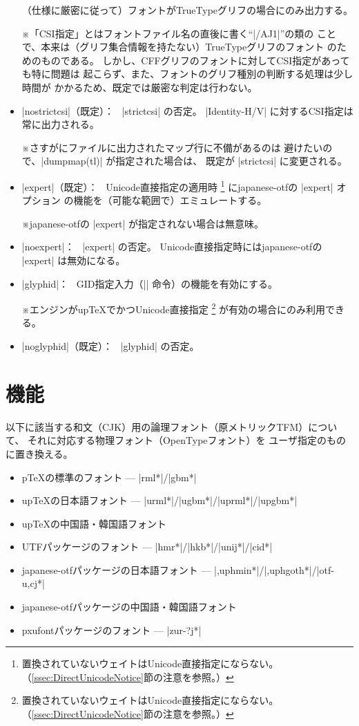 \documentclass[uplatex,dvipdfmx,a4paper]{jsarticle}
\newcommand{\Pkg}[1]{\textsf{#1}}
\newcommand{\Note}{\par\noindent ※}
\newcommand{\Means}{：\ }
\providecommand{\pTeX}{p\TeX}
\providecommand{\upTeX}{u\pTeX}
\begin{document}
\begin{itemize}
  （仕様に厳密に従って）フォントがTrueTypeグリフの場合にのみ出力する。
  \Note 「CSI指定」とはフォントファイル名の直後に書く“|/AJ1|”の類の
    ことで、本来は（グリフ集合情報を持たない）TrueTypeグリフのフォント
    のためのものである。
    しかし、CFFグリフのフォントに対してCSI指定があっても特に問題は
    起こらず、また、フォントのグリフ種別の判断する処理は少し時間が
    かかるため、既定では厳密な判定は行わない。
\item |nostrictcsi|（既定）\Means
  |strictcsi| の否定。
  |Identity-H/V| に対するCSI指定は常に出力される。
  \Note さすがにファイルに出力されたマップ行に不備があるのは
    避けたいので、|dumpmap(tl)| が指定された場合は、
    既定が |strictcsi| に変更される。
\item |expert|（既定）\Means
  Unicode直接指定の適用時
  \footnote{置換されていないウェイトはUnicode直接指定にならない。
    （\ref{ssec:DirectUnicodeNotice}節の注意を参照。）}%
  に\Pkg{japanese-otf}の |expert| オプション
  の機能を（可能な範囲で）エミュレートする。
  \Note \Pkg{japanese-otf}の |expert| が指定されない場合は無意味。
\item |noexpert|\Means
  |expert| の否定。
  Unicode直接指定時には\Pkg{japanese-otf}の |expert| は無効になる。
\item |glyphid|\Means
  GID指定入力（|\gid| 命令）の機能を有効にする。
  \Note エンジンが{\upTeX}でかつUnicode直接指定
  \footnote{置換されていないウェイトはUnicode直接指定にならない。
    （\ref{ssec:DirectUnicodeNotice}節の注意を参照。）}%
  が有効の場合にのみ利用できる。
\item |noglyphid|（既定）\Means
  |glyphid| の否定。
\end{itemize}

\section{機能}

以下に該当する和文（CJK）用の論理フォント（原メトリックTFM）について、
それに対応する物理フォント（OpenTypeフォント）を
ユーザ指定のものに置き換える。
\begin{itemize}
\item {\pTeX}の標準のフォント --- |rml*|/|gbm*|
\item {\upTeX}の日本語フォント --- |urml*|/|ugbm*|/|uprml*|/|upgbm*|
\item {\upTeX}の中国語・韓国語フォント
\item \Pkg{UTF}パッケージのフォント --- |hmr*|/|hkb*|/|unij*|/|cid*|
\item \Pkg{japanese-otf}パッケージの日本語フォント
  --- |{,up}hmin*|/|{,up}hgoth*|/|otf-{u,c}j*|
\item \Pkg{japanese-otf}パッケージの中国語・韓国語フォント
\item \Pkg{pxufont}パッケージのフォント
  --- |zur-?j*|
\end{itemize}
\end{document}

